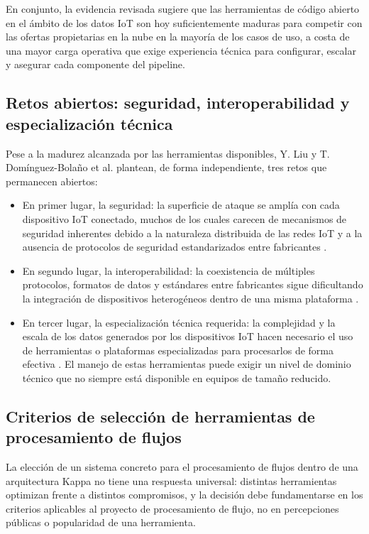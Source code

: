 En conjunto, la evidencia revisada sugiere que las herramientas de código abierto en el ámbito de los datos IoT son hoy suficientemente maduras para competir con las ofertas propietarias en la nube en la mayoría de los casos de uso, a costa de una mayor carga operativa que exige experiencia técnica para configurar, escalar y asegurar cada componente del pipeline.

\subsection{Retos abiertos: seguridad, interoperabilidad y especialización técnica}

Pese a la madurez alcanzada por las herramientas disponibles, Y. Liu \cite{liu2025} y T. Domínguez-Bolaño et al. \cite{dominguez2022} plantean, de forma independiente, tres retos que permanecen abiertos:

\begin{itemize}
    \item En primer lugar, la seguridad: la superficie de ataque se amplía con cada dispositivo IoT conectado, muchos de los cuales carecen de mecanismos de seguridad inherentes debido a la naturaleza distribuida de las redes IoT y a la ausencia de protocolos de seguridad estandarizados entre fabricantes \cite{liu2025}. 
    \item En segundo lugar, la interoperabilidad: la coexistencia de múltiples protocolos, formatos de datos y estándares entre fabricantes sigue dificultando la integración de dispositivos heterogéneos dentro de una misma plataforma \cite{dominguez2022}. 
    \item En tercer lugar, la especialización técnica requerida: la complejidad y la escala de los datos generados por los dispositivos IoT hacen necesario el uso de herramientas o plataformas especializadas para procesarlos de forma efectiva \cite{liu2025}. El manejo de estas herramientas puede exigir un nivel de dominio técnico que no siempre está disponible en equipos de tamaño reducido.
\end{itemize}

\subsection{Criterios de selección de herramientas de procesamiento de flujos}
\label{sec:criterios-streaming}

La elección de un sistema concreto para el procesamiento de flujos dentro de una arquitectura Kappa no tiene una respuesta universal: distintas herramientas optimizan frente a distintos compromisos, y la decisión debe fundamentarse en los criterios aplicables al proyecto de procesamiento de flujo, no en percepciones públicas o popularidad de una herramienta. 

